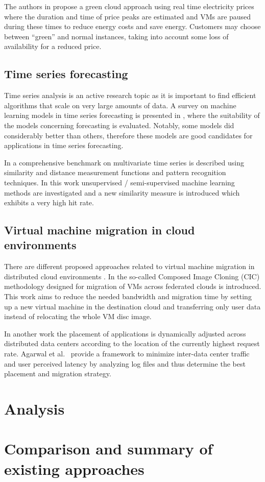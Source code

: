 The authors in \cite{lucanin2013take} propose a green cloud approach using real time electricity prices where the duration and time of price peaks are estimated and VMs are paused during these times to reduce energy costs and save energy. Customers may choose between ``green'' and normal instances, taking into account some loss of availability for a reduced price. 

\subsection{Time series forecasting}

Time series analysis is an active research topic as it is important to find efficient algorithms that scale on very large amounts of data. A survey on machine learning models in time series forecasting is presented in \cite{ahmed2010empirical}, where the suitability of the models concerning forecasting is evaluated. Notably, some models did considerably better than others, therefore these models are good candidates for applications in time series forecasting. 

In \cite{lin2012pattern} a comprehensive benchmark on multivariate time series is described using similarity and distance measurement functions and pattern recognition techniques. In this work unsupervised / semi-supervised machine learning methods are investigated and a new similarity measure is introduced which exhibits a very high hit rate. 

\subsection{Virtual machine migration in cloud environments}

There are different proposed approaches related to virtual machine migration in distributed cloud environments \cite{celesti2010improving, malet2010resource}. In \cite{celesti2010improving} the so-called Composed Image Cloning (CIC) methodology designed for migration of VMs across federated clouds is introduced. This work aims to reduce the needed bandwidth and migration time by setting up a new virtual machine in the destination cloud and transferring only user data instead of relocating the whole VM disc image. 

In another work \cite{malet2010resource} the placement of applications is dynamically adjusted across distributed data centers according to the location of the currently highest request rate. Agarwal et al.~\cite{agarwal2010volley} provide a framework to minimize inter-data center traffic and user perceived latency by analyzing log files and thus determine the best placement and migration strategy. 



\section{Analysis}


\section{Comparison and summary of existing approaches}

